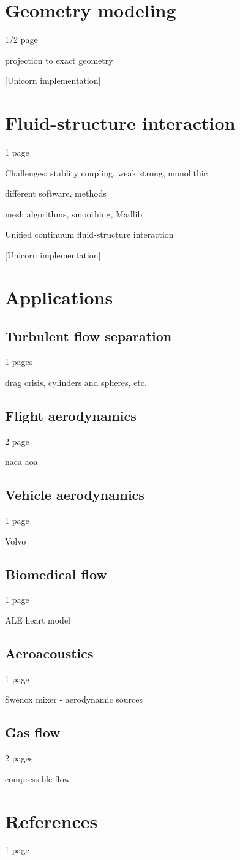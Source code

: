 \section{Geometry modeling}

1/2 page

projection to exact geometry

[Unicorn implementation]

\section{Fluid-structure interaction}

1 page

Challenges: stablity coupling, weak strong, monolithic

different software, methods

mesh algorithms, smoothing, Madlib

Unified continuum fluid-structure interaction

[Unicorn implementation]

\section{Applications}

\subsection{Turbulent flow separation}

1 pages

drag crisis, cylinders and spheres, etc.

\subsection{Flight aerodynamics}

2 page

naca aoa

\subsection{Vehicle aerodynamics}

1 page

Volvo

\subsection{Biomedical flow}

1 page

ALE heart model

\subsection{Aeroacoustics}

1 page

Swenox mixer - aerodynamic sources

\subsection{Gas flow}

2 pages

compressible flow

\section{References}

1 page
